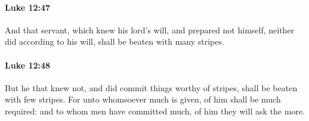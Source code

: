 		\paragraph{Luke 12:47} %
			\label{LUKE-12-47}

			And that servant, which knew his lord's will, and prepared not himself, neither did according to his will, shall be beaten with many stripes.

			\begin{framed}
			\scriptsize
				\begin{compactdesc}
					\item[SBLG] 
				\end{compactdesc}
			\end{framed}

		\paragraph{Luke 12:48} %
			\label{LUKE-12-48}

			But he that knew not, and did commit things worthy of stripes, shall be beaten with few stripes. For unto whomsoever much is given, of him shall be much required: and to whom men have committed much, of him they will ask the more.

